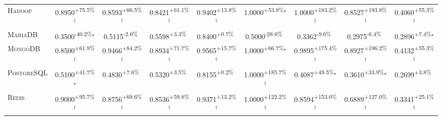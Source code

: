 \begin{table}[htbp]
\begin{tabular}{l|cccc|cccc}
\textsc{Hadoop} & \cellcolor{green!30}0.8950\textsuperscript{+75.5\%}$^\dagger$ & \cellcolor{green!30}0.8593\textsuperscript{+66.5\%}$^\dagger$ & \cellcolor{green!30}0.8421\textsuperscript{+61.1\%}$^\dagger$ & \cellcolor{green!30}0.9402\textsuperscript{+13.8\%}$^\dagger$ & \cellcolor{green!30}1.0000\textsuperscript{+53.8\%}$^\star$ & \cellcolor{green!30}1.0000\textsuperscript{+183.2\%}$^\dagger$ & \cellcolor{green!30}0.8527\textsuperscript{+193.8\%}$^\dagger$ & \cellcolor{green!30}0.4060\textsuperscript{+55.3\%}$^\dagger$ \\
\textsc{MariaDB} & \cellcolor{red!30}0.3500\textsuperscript{-40.2\%}$^\star$ & \cellcolor{red!30}0.5115\textsuperscript{-2.6\%}$^{\,\,\,}$ & \cellcolor{green!30}0.5598\textsuperscript{+3.3\%}$^{\,\,\,}$ & \cellcolor{green!30}0.8400\textsuperscript{+0.7\%}$^{\,\,\,}$ & \cellcolor{red!30}0.5000\textsuperscript{-28.6\%}$^{\,\,\,}$ & \cellcolor{red!30}0.3362\textsuperscript{-9.6\%}$^{\,\,\,}$ & \cellcolor{red!30}0.2975\textsuperscript{-6.4\%}$^{\,\,\,}$ & \cellcolor{green!30}0.2896\textsuperscript{+7.4\%}$^\star$ \\
\textsc{MongoDB} & \cellcolor{green!30}0.8500\textsuperscript{+61.9\%}$^\dagger$ & \cellcolor{green!30}0.9466\textsuperscript{+84.2\%}$^\dagger$ & \cellcolor{green!30}0.8934\textsuperscript{+71.7\%}$^\dagger$ & \cellcolor{green!30}0.9565\textsuperscript{+15.7\%}$^\dagger$ & \cellcolor{green!30}1.0000\textsuperscript{+66.7\%}$^\star$ & \cellcolor{green!30}0.9895\textsuperscript{+175.4\%}$^\dagger$ & \cellcolor{green!30}0.8927\textsuperscript{+196.2\%}$^\dagger$ & \cellcolor{green!30}0.4132\textsuperscript{+55.3\%}$^\dagger$ \\
\textsc{PostgreSQL} & \cellcolor{green!30}0.5100\textsuperscript{+41.7\%}$^\star$ & \cellcolor{green!30}0.4830\textsuperscript{+7.6\%}$^{\,\,\,}$ & \cellcolor{green!30}0.5320\textsuperscript{+3.5\%}$^{\,\,\,}$ & \cellcolor{green!30}0.8155\textsuperscript{+0.2\%}$^{\,\,\,}$ & \cellcolor{green!30}1.0000\textsuperscript{+185.7\%}$^\dagger$ & \cellcolor{green!30}0.4087\textsuperscript{+49.5\%}$^\star$ & \cellcolor{green!30}0.3610\textsuperscript{+33.9\%}$^\star$ & \cellcolor{green!30}0.2699\textsuperscript{+3.8\%}$^{\,\,\,}$ \\
\textsc{Redis} & \cellcolor{green!30}0.9000\textsuperscript{+95.7\%}$^\dagger$ & \cellcolor{green!30}0.8756\textsuperscript{+69.6\%}$^\dagger$ & \cellcolor{green!30}0.8536\textsuperscript{+59.8\%}$^\dagger$ & \cellcolor{green!30}0.9371\textsuperscript{+13.2\%}$^\dagger$ & \cellcolor{green!30}1.0000\textsuperscript{+122.2\%}$^\dagger$ & \cellcolor{green!30}0.8594\textsuperscript{+153.0\%}$^\dagger$ & \cellcolor{green!30}0.6889\textsuperscript{+127.0\%}$^\dagger$ & \cellcolor{green!30}0.3341\textsuperscript{+25.1\%}$^\dagger$ \\

\end{tabular}
\end{table}
